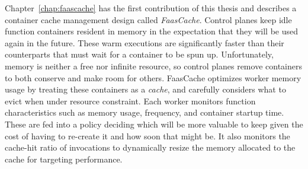 Chapter~\ref{chap:faascache} has the first contribution of this thesis and describes a container cache management design called \emph{FaasCache}.
Control planes keep idle function containers resident in memory in the expectation that they will be used again in the future.
These warm executions are significantly faster than their counterparts that must wait for a container to be spun up.
Unfortunately, memory is neither a free nor infinite resource, so control planes remove containers to both conserve and make room for others.
FaasCache optimizes worker memory usage by treating these containers as a \emph{cache}, and carefully considers what to evict when under resource constraint.
Each worker monitors function characteristics such as memory usage, frequency, and container startup time.
These are fed into a policy deciding which will be more valuable to keep given the cost of having to re-create it and how soon that might be.
It also monitors the cache-hit ratio of invocations to dynamically resize the memory allocated to the cache for targeting performance.


